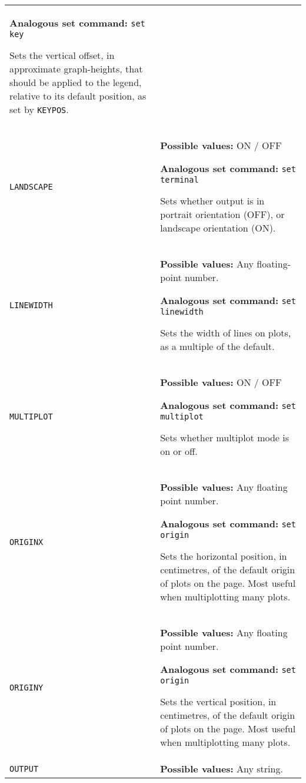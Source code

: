 \documentclass[a4paper,onecolumn,11pt]{book}
\begin{document}
\begin{longtable}{p{3.4cm}p{9cm}}
                   \textbf{Analogous set command:} \texttt{set key}\index{set key command@\texttt{set key} command}

                   Sets the vertical offset, in approximate graph-heights, that should be applied to the legend, relative to its default position, as set by \texttt{KEYPOS}.
                   \\
\texttt{LANDSCAPE} & \textbf{Possible values:} ON / OFF

                   \textbf{Analogous set command:} \texttt{set terminal}\index{set terminal command@\texttt{set terminal} command}

                   Sets whether output is in portrait orientation (OFF), or landscape orientation (ON).
                   \\
\texttt{LINEWIDTH} & \textbf{Possible values:} Any floating-point number.

                   \textbf{Analogous set command:} \texttt{set linewidth}\index{set linewidth command@\texttt{set linewidth} command}

                   Sets the width of lines on plots, as a  multiple of the default.
                   \\
\texttt{MULTIPLOT} & \textbf{Possible values:} ON / OFF

                   \textbf{Analogous set command:} \texttt{set multiplot}\index{set multiplot command@\texttt{set multiplot} command}

                   Sets whether multiplot mode is on or off.
                   \\
\texttt{ORIGINX} & \textbf{Possible values:} Any floating point number.

                   \textbf{Analogous set command:} \texttt{set origin}\index{set origin command@\texttt{set origin} command}

                   Sets the horizontal position, in centimetres, of the default origin of plots on the page. Most useful when multiplotting many plots.
                   \\
\texttt{ORIGINY} & \textbf{Possible values:} Any floating point number.

                   \textbf{Analogous set command:} \texttt{set origin}\index{set origin command@\texttt{set origin} command}

                   Sets the vertical position, in centimetres, of the default origin of plots on the page. Most useful when multiplotting many plots.
                   \\
\texttt{OUTPUT} & \textbf{Possible values:} Any string.


\end{longtable}
\end{document}
